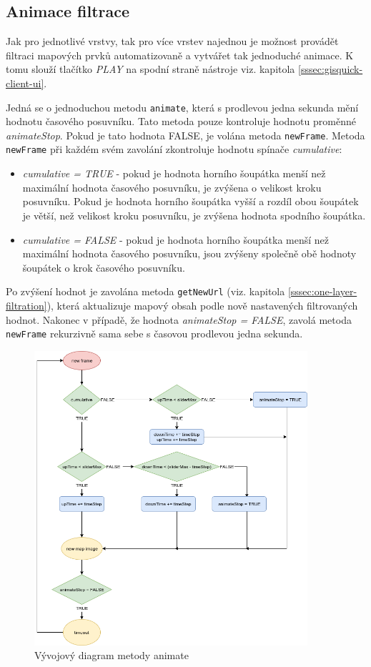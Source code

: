 \subsection{Animace filtrace}
\label{sssec:animation}

Jak pro jednotlivé vrstvy, tak pro více vrstev najednou je možnost
provádět filtraci mapových prvků automatizovaně a vytvářet tak
jednoduché animace. K tomu slouží tlačítko \textit{PLAY} na spodní
straně nástroje viz. kapitola \ref{sssec:gisquick-client-ui}.

Jedná se o jednoduchou metodu \verb|animate|, která s prodlevou jedna
sekunda mění hodnotu časového posuvníku. Tato metoda pouze kontroluje
hodnotu proměnné \textit{animateStop}. Pokud je tato hodnota FALSE, je
volána metoda \verb|newFrame|. Metoda \verb|newFrame| při každém svém
zavolání zkontroluje hodnotu spínače \textit{cumulative}:
\begin{itemize}
\item\textit{cumulative = TRUE} - pokud je hodnota horního šoupátka
menší než maximální hodnota časového posuvníku, je zvýšena o velikost
kroku posuvníku. Pokud je hodnota horního šoupátka vyšší a rozdíl obou
šoupátek je větší, než velikost kroku posuvníku, je zvýšena hodnota
spodního šoupátka.
\item\textit{cumulative = FALSE} - pokud je hodnota horního šoupátka
menší než maximální hodnota časového posuvníku, jsou zvýšeny
společně obě hodnoty šoupátek o krok časového posuvníku.
\end{itemize}
Po zvýšení hodnot je zavolána metoda \verb|getNewUrl| (viz. kapitola
\ref{sssec:one-layer-filtration}), která aktualizuje mapový obsah podle
nově nastavených filtrovaných hodnot. Nakonec v případě, že hodnota
\textit{animateStop = FALSE}, zavolá metoda \verb|newFrame| rekurzivně sama sebe s časovou prodlevou jedna sekunda.

\begin{figure}[h!]
\centering
\includegraphics[width=0.9\textwidth]{../img/animate.png}
\caption{Vývojový diagram metody animate}
\label{fig:animate-chart}
\end{figure}
